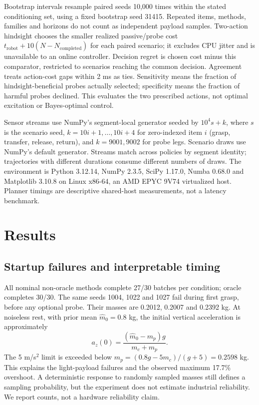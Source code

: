 \documentclass[10pt,twocolumn]{article}
\begin{document}
Bootstrap intervals resample paired seeds 10,000 times within the stated conditioning set, using a fixed bootstrap seed 31415. Repeated items, methods, families and horizons do not count as independent payload samples. Two-action hindsight chooses the smaller realized passive/probe cost $t_{\mathrm{robot}}+10(N-N_{\mathrm{completed}})$ for each paired scenario; it excludes CPU jitter and is unavailable to an online controller. Decision regret is chosen cost minus this comparator, restricted to scenarios reaching the common decision. Agreement treats action-cost gaps within 2 ms as ties. Sensitivity means the fraction of hindsight-beneficial probes actually selected; specificity means the fraction of harmful probes declined. This evaluates the two prescribed actions, not optimal excitation or Bayes-optimal control.

Sensor streams use NumPy's segment-local generator seeded by $10^4s+k$, where $s$ is the scenario seed, $k=10i+1,\ldots,10i+4$ for zero-indexed item $i$ (grasp, transfer, release, return), and $k=9001,9002$ for probe legs. Scenario draws use NumPy's default generator. Streams match across policies by segment identity; trajectories with different durations consume different numbers of draws. The environment is Python 3.12.14, NumPy 2.3.5, SciPy 1.17.0, Numba 0.68.0 and Matplotlib 3.10.8 on Linux x86-64, an AMD EPYC 9V74 virtualized host. Planner timings are descriptive shared-host measurements, not a latency benchmark.

\section{Results}
\subsection{Startup failures and interpretable timing}
All nominal non-oracle methods complete 27/30 batches per condition; oracle completes 30/30. The same seeds 1004, 1022 and 1027 fail during first grasp, before any optional probe. Their masses are 0.2012, 0.2007 and 0.2392 kg. At noiseless rest, with prior mean $\hat m_0=0.8$ kg, the initial vertical acceleration is approximately
\begin{equation}
 a_z(0)=\frac{(\hat m_0-m_p)g}{m_c+m_p}.
\end{equation}
The 5 m/s$^2$ limit is exceeded below $m_p=(0.8g-5m_c)/(g+5)=0.2598$ kg. This explains the light-payload failures and the observed maximum 17.7\% overshoot. A deterministic response to randomly sampled masses still defines a sampling probability, but the experiment does not estimate industrial reliability. We report counts, not a hardware reliability claim.
\end{document}
